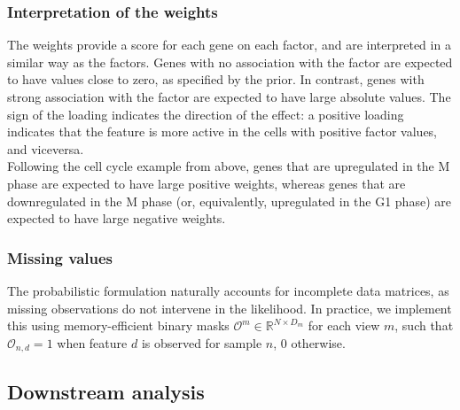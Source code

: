 \subsubsection{Interpretation of the weights}
The weights provide a score for each gene on each factor, and are interpreted in a similar way as the factors. Genes with no association with the factor are expected to have values close to zero, as specified by the prior. In contrast, genes with strong association with the factor are expected to have large absolute values. The sign of the loading indicates the direction of the effect: a positive loading indicates that the feature is more active in the cells with positive factor values, and viceversa. \\
Following the cell cycle example from above, genes that are upregulated in the M phase are expected to have large positive weights, whereas genes that are downregulated in the M phase (or, equivalently, upregulated in the G1 phase) are expected to have large negative weights.



\subsubsection{Missing values} \label{section:mofa_missing_values}
The probabilistic formulation naturally accounts for incomplete data matrices, as missing observations do not intervene in the likelihood. In practice, we implement this using memory-efficient binary masks $\mathcal{O}^m \in \mathbb{R}^{N\times D_m}$ for each view $m$, such that $\mathcal{O}_{n,d} = 1$ when feature $d$ is observed for sample $n$, 0 otherwise. 

\subsection{Downstream analysis} \label{mofa:downstream}

